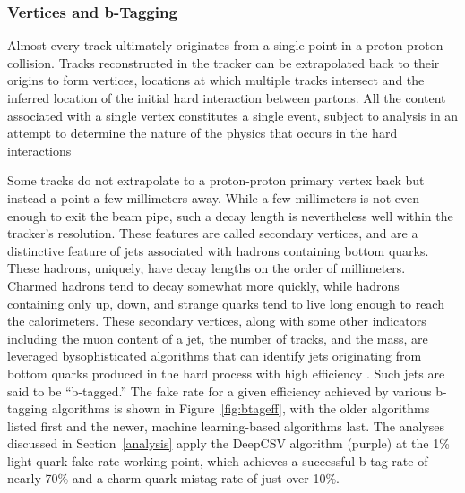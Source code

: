     \subsubsection{Vertices and b-Tagging} \label{sec:btagging}

    Almost every track ultimately originates from a single point in a proton-proton collision.
    Tracks reconstructed in the tracker can be extrapolated back to their origins to form vertices, locations at which multiple tracks intersect and the inferred location of the initial hard interaction between partons.
    All the content associated with a single vertex constitutes a single event, subject to analysis in an attempt to determine the nature of the physics that occurs in the hard interactions

    Some tracks do not extrapolate to a proton-proton primary vertex back but instead a point a few millimeters away.
    While a few millimeters is not even enough to exit the beam pipe, such a decay length is nevertheless well within the tracker's resolution.
    These features are called secondary vertices, and are a distinctive feature of jets associated with hadrons containing bottom quarks.
    These hadrons, uniquely, have decay lengths on the order of millimeters.
    Charmed hadrons tend to decay somewhat more quickly, while hadrons containing only up, down, and strange quarks tend to live long enough to reach the calorimeters.
    These secondary vertices, along with some other indicators including the muon content of a jet, the number of tracks, and the mass, are leveraged bysophisticated algorithms that can identify jets originating from bottom quarks produced in the hard process with high efficiency \cite{btagging}.
    Such jets are said to be ``b-tagged.''
    The fake rate for a given efficiency achieved by various b-tagging algorithms is shown in Figure~\ref{fig:btageff}, with the older algorithms listed first and the newer, machine learning-based algorithms last.
    The analyses discussed in Section~\ref{analysis} apply the DeepCSV algorithm (purple) at the 1\% light quark fake rate working point, which achieves a successful b-tag rate of nearly 70\% and a charm quark mistag rate of just over 10\%.

